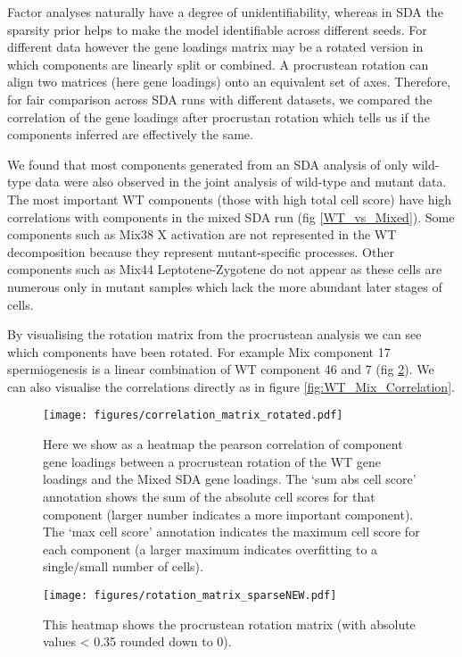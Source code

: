 Factor analyses naturally have a degree of unidentifiability, whereas in SDA the sparsity prior helps to make the model identifiable across different seeds. For different data however the gene loadings matrix may be a rotated version in which components are linearly split or combined. A procrustean rotation can align two matrices (here gene loadings) onto an equivalent set of axes. Therefore, for fair comparison across SDA runs with different datasets, we compared the correlation of the gene loadings after procrustan rotation which tells us if the components inferred are effectively the same.

We found that most components generated from an SDA analysis of only wild-type data were also observed in the joint analysis of wild-type and mutant data. The most important WT components (those with high total cell score) have high correlations with components in the mixed SDA run (fig \ref{WT_vs_Mixed}). Some components such as Mix38 X activation are not represented in the WT decomposition because they represent mutant-specific processes. Other components such as Mix44 Leptotene-Zygotene do not appear as these cells are numerous only in mutant samples which lack the more abundant later stages of cells.

By visualising the rotation matrix from the procrustean analysis we can see which components have been rotated. For example Mix component 17 spermiogenesis is a linear combination of WT component 46 and 7 (fig \ref{fig:WT_Mix_Rotation}). We can also visualise the correlations directly as in figure \ref{fig:WT_Mix_Correlation}.

\begin{figure}[H]
	\centering
	\texttt{[image: figures/correlation\_matrix\_rotated.pdf]}
	\caption{Here we show as a heatmap the pearson correlation of component gene loadings between a procrustean rotation of the WT gene loadings and the Mixed SDA gene loadings. The ‘sum abs cell score’ annotation shows the sum of the absolute cell scores for that component (larger number indicates a more important component). The ‘max cell score’ annotation indicates the maximum cell score for each component (a larger maximum indicates overfitting to a single/small number of cells).}
	\label{fig:WT_vs_Mixed}
\end{figure}

\begin{figure}[H]
	\centering
	\texttt{[image: figures/rotation\_matrix\_sparseNEW.pdf]}
	\caption{This heatmap shows the procrustean rotation matrix (with absolute values < 0.35 rounded down to 0).}
	\label{fig:WT_Mix_Rotation}
\end{figure}

